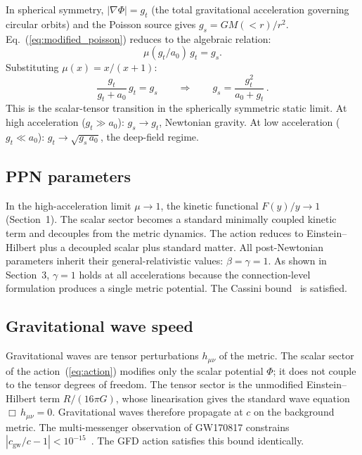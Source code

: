 \documentclass[11pt]{article}
\begin{document}
In spherical symmetry, $|\nabla\Phi| = g_t$ (the total
gravitational acceleration governing circular orbits) and
the Poisson source gives $g_s = GM({<}r)/r^2$.
Eq.~(\ref{eq:modified_poisson}) reduces to the algebraic
relation:
\begin{equation}
  \mu(g_t/a_0)\,g_t = g_s.
  \label{eq:algebraic}
\end{equation}
Substituting $\mu(x) = x/(x{+}1)$:
\begin{equation}
  \frac{g_t}{g_t + a_0}\,g_t = g_s
  \qquad\Longrightarrow\qquad
  \boxed{g_s = \frac{g_t^2}{a_0 + g_t}\,.}
  \label{eq:sst}
\end{equation}
This is the scalar-tensor transition in the spherically
symmetric static limit.  At high acceleration
($g_t \gg a_0$): $g_s \to g_t$, Newtonian gravity.  At
low acceleration ($g_t \ll a_0$):
$g_t \to \sqrt{g_s\,a_0}$, the deep-field regime.

\subsection*{PPN parameters}

In the high-acceleration limit $\mu \to 1$, the kinetic
functional $F(y)/y \to 1$ (Section~1).  The scalar sector
becomes a standard minimally coupled kinetic term and
decouples from the metric dynamics.  The action reduces
to Einstein--Hilbert plus a decoupled scalar plus
standard matter.  All post-Newtonian parameters inherit
their general-relativistic values:
$\beta = \gamma = 1$.  As shown in Section~3, $\gamma = 1$
holds at all accelerations because the connection-level
formulation produces a single metric potential.  The Cassini
bound~\cite{Bertotti2003} is satisfied.

\subsection*{Gravitational wave speed}

Gravitational waves are tensor perturbations $h_{\mu\nu}$
of the metric.  The scalar sector of the
action~(\ref{eq:action}) modifies only the scalar
potential $\Phi$; it does not couple to the tensor
degrees of freedom.  The tensor sector is the unmodified
Einstein--Hilbert term $R/(16\pi G)$, whose linearisation
gives the standard wave equation
$\Box\,h_{\mu\nu} = 0$.  Gravitational waves therefore
propagate at $c$ on the background metric.  The
multi-messenger observation of GW170817 constrains
$|c_{\text{gw}}/c - 1| < 10^{-15}$~\cite{Abbott2017}.
The GFD action satisfies this bound identically.
\end{document}
